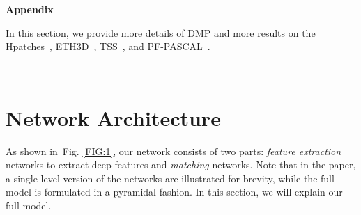 \documentclass[10pt,twocolumn,letterpaper]{article}
\newcommand{\figref}[1]{Fig. \ref{#1}}
\begin{document}
{\small


}
\newpage
\clearpage
\appendix
\begin{center}
	\textbf{\Large Appendix}
\end{center}
\renewcommand\thesection{\Alph{section}}
\renewcommand{\thefigure}{\arabic{figure}}\renewcommand{\theHfigure}{A\arabic{figure}}\setcounter{figure}{0}
In this section, we provide more details of DMP and more results on the Hpatches~\cite{balntas2017hpatches}, ETH3D~\cite{schops2017multi}, TSS~\cite{taniai2016joint}, and PF-PASCAL~\cite{ham2016proposal}.

\begin{figure*}[t!]
	\centering
	\renewcommand{\thesubfigure}{}
	\\
	\vspace{-10pt}
\caption{\textbf{Overview of DMP architecture.} Overview of our proposed iterative architecture, which consists of feature extraction network and matching network. Source and target images are first fed into feature backbone network to obtain deep features. Each pyramidal features are then fed into adaptation layers and the refined features are obtained. Subsequently, the refined features are fed into a matching network and the estimated flow is up-sampled to warp the next level feature. The final output consists of refined features from target image and the flow field of size $\frac{H}{4} \times \frac{W}{4}$. }	\label{FIG:1}
\end{figure*}

\section{Network Architecture}\label{sec:1}
As shown in~\figref{FIG:1}, our network consists of two parts: {\it feature extraction} networks to extract deep features and {\it matching} networks. 
Note that in the paper, a single-level version of the networks are
illustrated for brevity, while the full model is formulated in a pyramidal fashion. In this section, we will explain our full model. \vspace{-10pt}
\end{document}
